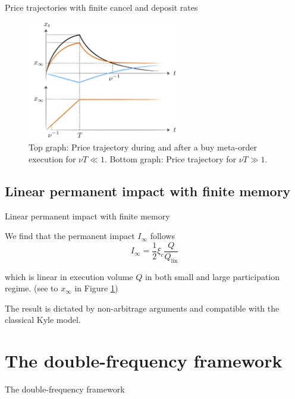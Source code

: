 \documentclass{beamer}
\begin{document}
\begin{frame}{Price trajectories with finite cancel and deposit rates}

\begin{figure}
\centering
\includegraphics[width=0.6\textwidth]{figure2.PNG}
\caption{\label{fig:f2}Top graph: Price trajectory during and after a buy meta-order execution for $\nu T \ll 1$. Bottom graph: Price trajectory for $\nu T \gg 1$.}
\end{figure}

\end{frame}

\subsection{Linear permanent impact with finite memory}

\begin{frame}{Linear permanent impact with finite memory}

We find that the permanent impact $I_\infty$ follows
\begin{equation}
I_\infty=\frac12\xi_c\frac{Q}{Q_\text{lin}}
\end{equation}

which is linear in execution volume $Q$ in both small and large participation regime. (see to $x_\infty$ in Figure \ref{fig:f2}) \newline

The result is dictated by non-arbitrage arguments and compatible with the classical Kyle model.

\end{frame}

\section{The double-frequency framework}

\begin{frame}{The double-frequency framework}
  \tableofcontents[currentsection]
\end{frame}
\end{document}
